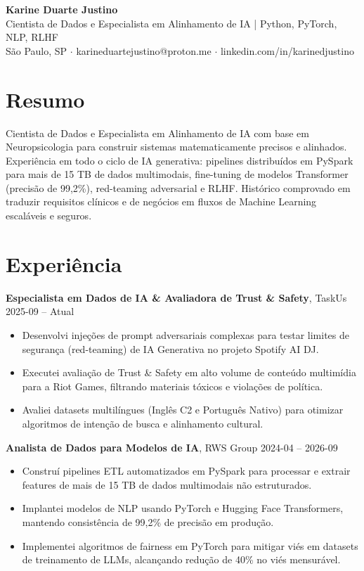 \documentclass[10pt,a4paper]{article}
\begin{document}
{\LARGE\bfseries Karine Duarte Justino}\\[2pt]
{\large Cientista de Dados e Especialista em Alinhamento de IA | Python, PyTorch, NLP, RLHF}\\[2pt]
São Paulo, SP $\cdot$ karineduartejustino@proton.me $\cdot$ linkedin.com/in/karinedjustino

\section*{Resumo}

Cientista de Dados e Especialista em Alinhamento de IA com base em Neuropsicologia para construir sistemas matematicamente precisos e alinhados. Experiência em todo o ciclo de IA generativa: pipelines distribuídos em PySpark para mais de 15 TB de dados multimodais, fine-tuning de modelos Transformer (precisão de 99,2\%), red-teaming adversarial e RLHF. Histórico comprovado em traduzir requisitos clínicos e de negócios em fluxos de Machine Learning escaláveis e seguros.

\section*{Experiência}

\textbf{Especialista em Dados de IA \& Avaliadora de Trust \& Safety}, TaskUs \hfill 2025-09 -- Atual\\
\begin{itemize}
  \item Desenvolvi injeções de prompt adversariais complexas para testar limites de segurança (red-teaming) de IA Generativa no projeto Spotify AI DJ.
  \item Executei avaliação de Trust \& Safety em alto volume de conteúdo multimídia para a Riot Games, filtrando materiais tóxicos e violações de política.
  \item Avaliei datasets multilíngues (Inglês C2 e Português Nativo) para otimizar algoritmos de intenção de busca e alinhamento cultural.
\end{itemize}

\textbf{Analista de Dados para Modelos de IA}, RWS Group \hfill 2024-04 -- 2026-09\\
\begin{itemize}
  \item Construí pipelines ETL automatizados em PySpark para processar e extrair features de mais de 15 TB de dados multimodais não estruturados.
  \item Implantei modelos de NLP usando PyTorch e Hugging Face Transformers, mantendo consistência de 99,2\% de precisão em produção.
  \item Implementei algoritmos de fairness em PyTorch para mitigar viés em datasets de treinamento de LLMs, alcançando redução de 40\% no viés mensurável.
\end{itemize}
\end{document}
